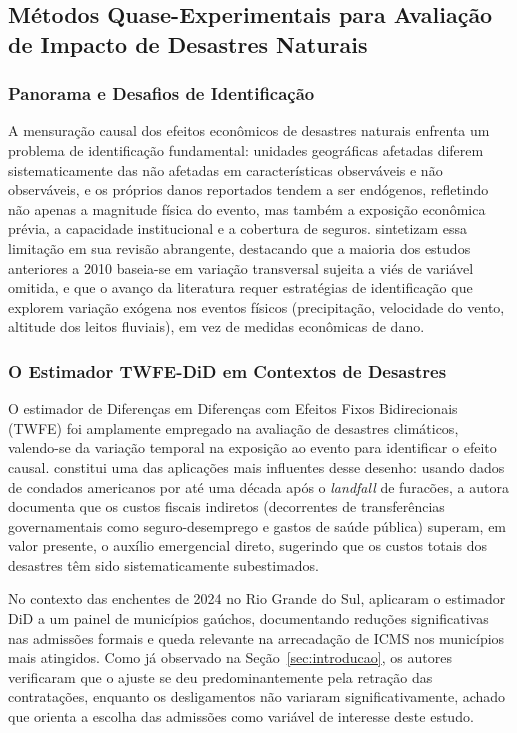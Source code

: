 \documentclass[a4paper,12pt]{article}
\begin{document}
\subsection{Métodos Quase-Experimentais para Avaliação de Impacto de Desastres
Naturais}
\label{sub:metodos}

\subsubsection{Panorama e Desafios de Identificação}

A mensuração causal dos efeitos econômicos de desastres naturais enfrenta um problema
de identificação fundamental: unidades geográficas afetadas diferem sistematicamente das
não afetadas em características observáveis e não observáveis, e os próprios danos
reportados tendem a ser endógenos, refletindo não apenas a magnitude física do evento,
mas também a exposição econômica prévia, a capacidade institucional e a cobertura de
seguros.  sintetizam essa limitação em sua revisão abrangente,
destacando que a maioria dos estudos anteriores a 2010 baseia-se em variação transversal
sujeita a viés de variável omitida, e que o avanço da literatura requer estratégias de
identificação que explorem variação exógena nos eventos físicos (precipitação,
velocidade do vento, altitude dos leitos fluviais), em vez de medidas econômicas de dano.

\subsubsection{O Estimador TWFE-DiD em Contextos de Desastres}

O estimador de Diferenças em Diferenças com Efeitos Fixos Bidirecionais (TWFE) foi
amplamente empregado na avaliação de desastres climáticos, valendo-se da variação
temporal na exposição ao evento para identificar o efeito causal. 
constitui uma das aplicações mais influentes desse desenho: usando dados de condados
americanos por até uma década após o \textit{landfall} de furacões, a autora documenta
que os custos fiscais indiretos (decorrentes de transferências governamentais como
seguro-desemprego e gastos de saúde pública) superam, em valor presente, o auxílio
emergencial direto, sugerindo que os custos totais dos desastres têm sido sistematicamente
subestimados.

No contexto das enchentes de 2024 no Rio Grande do Sul, 
aplicaram o estimador DiD a um painel de municípios gaúchos, documentando reduções
significativas nas admissões formais e queda relevante na arrecadação de ICMS nos
municípios mais atingidos. Como já observado na Seção~\ref{sec:introducao}, os autores
verificaram que o ajuste se deu predominantemente pela retração das contratações,
enquanto os desligamentos não variaram significativamente, achado que orienta a
escolha das admissões como variável de interesse deste estudo.
\end{document}
